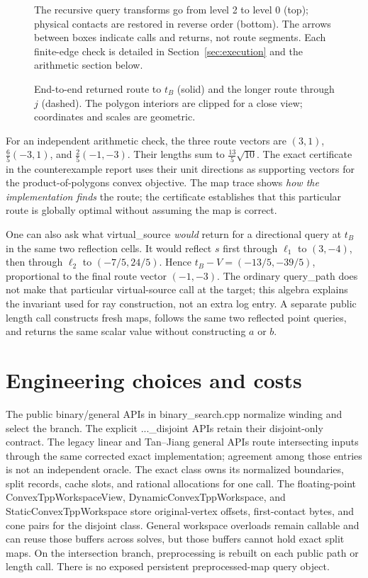 \documentclass[12pt,a4paper]{article}
\newcommand{\code}[1]{{\ttfamily\color{codekw}#1}}
\begin{document}
\begin{figure}[htbp]\centering\figrefoldtrace\caption{The recursive query transforms go from level 2 to level 0 (top); physical contacts are restored in reverse order (bottom). The arrows between boxes indicate calls and returns, not route segments. Each finite-edge check is detailed in Section~\ref{sec:execution} and the arithmetic section below.}\label{fig:refold-trace}\end{figure}

\begin{figure}[h]\centering\figpath\caption{End-to-end returned route to \(t_B\) (solid) and the longer route through \(j\) (dashed). The polygon interiors are clipped for a close view; coordinates and scales are geometric.}\label{fig:path}\end{figure}

For an independent arithmetic check, the three route vectors are \((3,1)\), \(\frac65(-3,1)\), and \(\frac25(-1,-3)\). Their lengths sum to \(\frac{13}{5}\sqrt{10}\). The exact certificate in the counterexample report uses their unit directions as supporting vectors for the product-of-polygons convex objective. The map trace shows \emph{how the implementation finds} the route; the certificate establishes that this particular route is globally optimal without assuming the map is correct.

One can also ask what \code{virtual\_source} \emph{would} return for a directional query at \(t_B\) in the same two reflection cells. It would reflect \(s\) first through \(\ell_1\) to \((3,-4)\), then through \(\ell_2\) to \((-7/5,24/5)\). Hence \(t_B-V=(-13/5,-39/5)\), proportional to the final route vector \((-1,-3)\). The ordinary \code{query\_path} does not make that particular virtual-source call at the target; this algebra explains the invariant used for ray construction, not an extra log entry. A separate public length call constructs fresh maps, follows the same two reflected point queries, and returns the same scalar value without constructing \(a\) or \(b\).

\section{Engineering choices and costs}
The public binary/general APIs in \code{binary\_search.cpp} normalize winding and select the branch. The explicit \code{...\_disjoint} APIs retain their disjoint-only contract. The legacy linear and Tan--Jiang general APIs route intersecting inputs through the same corrected exact implementation; agreement among those entries is not an independent oracle. The exact class owns its normalized boundaries, split records, cache slots, and rational allocations for one call. The floating-point \code{ConvexTppWorkspaceView}, \code{DynamicConvexTppWorkspace}, and \code{StaticConvexTppWorkspace} store original-vertex offsets, first-contact bytes, and cone pairs for the disjoint class. General workspace overloads remain callable and can reuse those buffers across solves, but those buffers cannot hold exact split maps. On the intersection branch, preprocessing is rebuilt on each public path or length call. There is no exposed persistent preprocessed-map query object.
\end{document}
